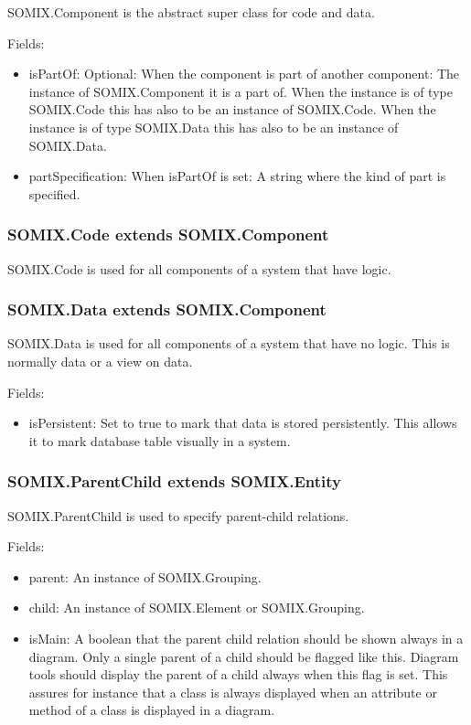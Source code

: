 \documentclass[preprint,12pt]{elsarticle}
\begin{document}
SOMIX.Component is the abstract super class for code and data.

Fields:
\begin{itemize}
\item isPartOf: Optional: When the component is part of another component: The instance of SOMIX.Component it is a part of. When the instance is of type SOMIX.Code this has also to be an instance of SOMIX.Code. When the instance is of type SOMIX.Data this has also to be an instance of SOMIX.Data.
\item partSpecification: When isPartOf is set: A string where the kind of part is specified.
\end{itemize}

\subsubsection{SOMIX.Code extends SOMIX.Component}

SOMIX.Code is used for all components of a system that have logic.

\subsubsection{SOMIX.Data extends SOMIX.Component}

SOMIX.Data is used for all components of a system that have no logic. This is normally data or a view on data.

Fields:
\begin{itemize}
\item isPersistent: Set to true to mark that data is stored persistently. This allows it to mark database table visually in a system.
\end{itemize}

\subsubsection{SOMIX.ParentChild extends SOMIX.Entity}

SOMIX.ParentChild is used to specify parent-child relations.

Fields:
\begin{itemize}
\item parent: An instance of SOMIX.Grouping.
\item child: An instance of SOMIX.Element or SOMIX.Grouping.
\item isMain: A boolean that the parent child relation should be shown always in a diagram. Only a single parent of a child should be flagged like this. Diagram tools should display the parent of a child always when this flag is set. This assures for instance that a class is always displayed when an attribute or method of a class is displayed in a diagram.
\end{itemize}
\end{document}
